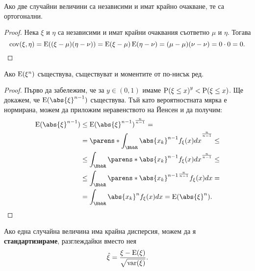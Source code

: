 \documentclass{../../common/topic}
\begin{document}
\begin{proposition}\label{thm:independence_implies_orthogonality}
  Ако две случайни величини са независими и имат крайно очакване, те са ортогонални.
\end{proposition}
\begin{proof}
  Нека \( \xi \) и \( \eta \) са независими и имат крайни очаквания съответно \( \mu \) и \( \eta \). Тогава
  \begin{equation*}
    \operatorname{cov}(\xi, \eta)
    =
    \operatorname{E}((\xi - \mu) (\eta - \nu))
    =
    \operatorname{E}(\xi - \mu) \operatorname{E}(\eta - \nu)
    =
    (\mu - \mu) (\nu - \nu)
    =
    0 \cdot 0
    =
    0.
  \end{equation*}
\end{proof}

\begin{proposition}\label{thm:lower_order_moments_exist}
  Ако \( \operatorname{E}(\xi^n) \) съществува, съществуват и моментите от по-нисък ред.
\end{proposition}
\begin{proof}
  Първо да забележим, че за \( y \in (0, 1) \) имаме \( {\operatorname{P}(\xi \leq x)}^y < \operatorname{P}(\xi \leq x) \). Ще докажем, че \( \Expect({\abs{\xi}}^{n-1}) \) съществува. Тъй като вероятностната мярка е нормирана, можем да приложим неравенството на Йенсен и да получим:
  \begin{align*}
    \Expect({\abs{\xi}}^{n-1})
    &\leq
    {\Expect({\abs{\xi}}^{n-1})}^{\frac n {n-1}}
    = \\ &=
    {\parens*{ \int_{\BbbR} {\abs{x_k}}^{n-1} f_\xi(x) dx }}^{\frac n {n-1}}
    \leq \\ &\leq
    \int_{\BbbR} {\parens*{{\abs{x_k}}^{n-1} f_\xi(x) dx }}^{\frac n {n-1}}
    \leq \\ &\leq
    \int_{\BbbR} {\parens*{{\abs{x_k}}^{n-1} }}^{\frac n {n-1}} f_\xi(x) dx
    = \\ &=
    \int_{\BbbR} {\abs{x_k}}^n f_\xi(x) dx
    =
    \Expect({\abs{\xi}}^n).
  \end{align*}
\end{proof}

\begin{definition}
  Ако една случайна величина има крайна дисперсия, можем да я \textbf{стандартизираме}, разглеждайки вместо нея
  \begin{equation*}
    \hat \xi = \frac {\xi - \operatorname{E}(\xi)} {\sqrt{\operatorname{var}(\xi)}}.
  \end{equation*}
\end{definition}
\end{document}
